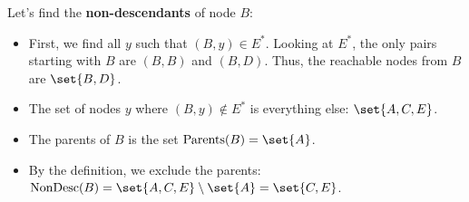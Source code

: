 
Let's find the \textbf{non-descendants} of node $B$:
\begin{itemize}
    \item First, we find all $y$ such that $(B,y) \in E^{*}$. Looking at $E^{*}$, the only pairs starting with $B$ are $(B,B)$ and $(B,D)$. Thus, the reachable nodes from $B$ are $\set{B, D}$.
    \item The set of nodes $y$ where $(B,y) \notin E^{*}$ is everything else: $\set{A, C, E}$.
    \item The parents of $B$ is the set $\text{Parents}(B) = \set{A}$.
    \item By the definition, we exclude the parents: $\text{NonDesc}(B) = \set{A, C, E} \setminus \set{A} = \set{C, E}$.
\end{itemize}